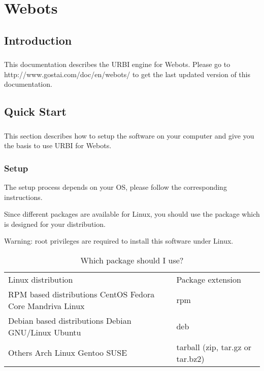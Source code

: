 \chapter{Webots}
\label{sec:webots}
\section{Introduction}
\label{webots.intro}%

\subsection{}\label{webots.intro.intro}%

This documentation describes the URBI engine for Webots.  Please go to
http://www.gostai.com/doc/en/webots/ to get the last updated version
of this documentation.



\section{Quick Start}
\label{webots.quickstart}%

\subsection{}\label{webots.quickstart.intro}%

This section describes how to setup the software on your computer and
give you the basis to use URBI for Webots.


\subsection{Setup}
\label{webots.setup}%

The setup process depends on your OS, please follow the corresponding
instructions.

Since different packages are available for Linux, you should use the
package which is designed for your distribution.

Warning: root privileges are required to install this software under
Linux.

\begin{table}[htbp]
\begin{center}
\begin{tabular}{ll}\hline
Linux distribution &    Package extension\\
RPM based distributions
CentOS
Fedora Core
Mandriva Linux &
rpm\\
Debian based distributions
Debian GNU/Linux
Ubuntu &
deb \\
Others
Arch Linux
Gentoo
SUSE &
tarball (zip, tar.gz or tar.bz2)\\
\hline
\end{tabular}

\end{center}

\caption{Which package should I use?}
\label{webots.setup.distributions}%
\end{table}

